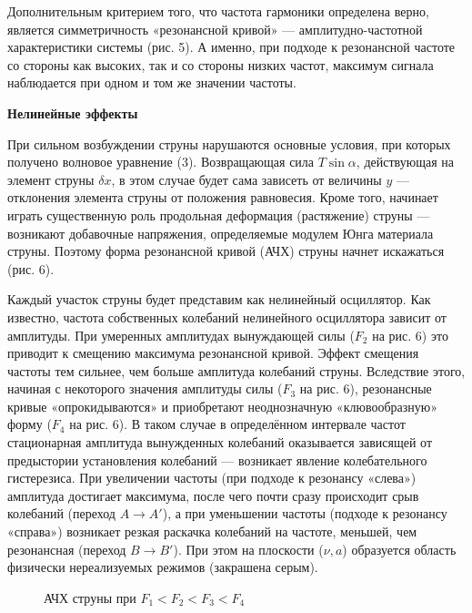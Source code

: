\documentclass[14pt]{article}
\begin{document}
Дополнительным критерием того, что частота гармоники определена верно, является симметричность «резонансной кривой» — амплитудно-частотной характеристики системы (рис. 5). А именно, при подходе к резонансной частоте со стороны как высоких, так и со стороны низких частот, максимум сигнала наблюдается при одном и том же значении частоты.

\vspace{1cm}
\textbf{Нелинейные эффекты}

При сильном возбуждении струны нарушаются основные условия, при которых получено волновое уравнение (3). Возвращающая сила $T\sin\alpha$, действующая на элемент струны $\delta x$, в этом случае будет сама зависеть от величины $y$ --- отклонения элемента струны от положения равновесия. Кроме того, начинает играть существенную роль продольная деформация (растяжение) струны --- возникают добавочные напряжения, определяемые модулем Юнга материала струны. Поэтому форма резонансной кривой (АЧХ) струны начнет искажаться (рис. 6).

Каждый участок струны будет представим как нелинейный осциллятор. Как известно, частота собственных колебаний нелинейного осциллятора зависит от амплитуды. При умеренных амплитудах вынуждающей силы ($F_2$ на рис. 6) это приводит к смещению максимума резонансной кривой. Эффект смещения частоты тем сильнее, чем больше амплитуда колебаний струны. Вследствие этого, начиная с некоторого значения амплитуды силы ($F_3$ на рис. 6), резонансные кривые «опрокидываются» и приобретают неоднозначную «клювообразную» форму ($F_4$ на рис. 6). В таком случае в определённом интервале частот стационарная амплитуда вынужденных колебаний оказывается зависящей от предыстории установления колебаний --- возникает явление колебательного гистерезиса. При увеличении частоты (при подходе к резонансу «слева») амплитуда достигает максимума, после чего почти сразу происходит срыв колебаний (переход $A \rightarrow A'$), а при уменьшении частоты (подходе к резонансу «справа») возникает резкая раскачка колебаний на частоте, меньшей, чем резонансная (переход $B \rightarrow B'$). При этом на плоскости ($\nu, a$) образуется область физически нереализуемых режимов (закрашена серым).

\begin{figure}[h!]
	\caption{АЧХ струны при $F_1 < F_2 < F_3 < F_4$}
	\label{fig:image}
\end{figure}
\end{document}
